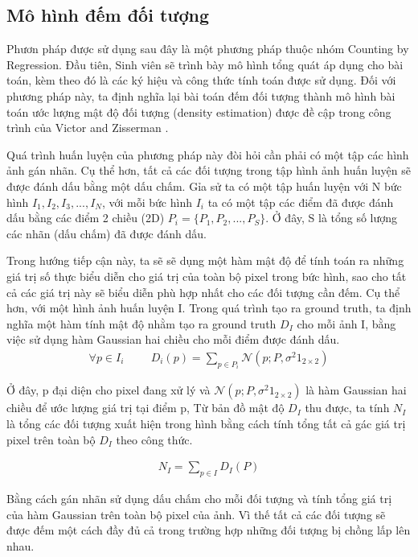 \subsection{Mô hình đếm đối tượng}
	Phươn pháp được sử dụng sau đây là một phương pháp thuộc nhóm Counting by Regression. Đầu tiên, Sinh viên sẽ trình bày mô hình tổng quát áp dụng cho bài toán, kèm theo đó là các ký hiệu và công thức tính toán được sử dụng. Đối với phương pháp này, ta định nghĩa lại bài toán đếm đối tượng thành mô hình bài toán ước lượng mật độ đối tượng (density estimation) được đề cập trong công trình của Victor and Zisserman \cite{lempitsky2010learning}. \par
	Quá trình huấn luyện của phương pháp này đòi hỏi cần phải có một tập các hình ảnh gán nhãn. Cụ thể hơn, tất cả các đối tượng trong tập hình ảnh huấn luyện sẽ được đánh dấu bằng một dấu chấm. Gỉa sử ta có một tập huấn luyện với N bức hình $I_1,I_2,I_3,...,I_N$, với mỗi bức hình $I_i$ ta có một tập các điểm đã được đánh dấu bằng các điểm 2 chiều (2D) $P_i = \{P_1,P_2,...,P_S\}$. Ở đây, S là tổng số lượng các nhãn (dấu chấm) đã được đánh dấu. \par
	Trong hướng tiếp cận này, ta sẽ sẽ dụng một hàm mật độ để tính toán ra những giá trị số thực biểu diễn cho giá trị của toàn bộ pixel trong bức hình, sao cho tất cả các giá trị này sẽ biểu diễn phù hợp nhất cho các đối tượng cần đếm. Cụ thể hơn, với một hình ảnh huấn luyện I. Trong quá trình tạo ra ground truth, ta định nghĩa một hàm tính mật độ nhằm tạo ra ground truth $D_I$ cho mỗi ảnh I, bằng việc sử dụng hàm Gaussian hai chiều cho mỗi điểm được đánh dấu.
\begin{align}
   \forall p \in I_i   \hspace{1cm}   D_i(p) = \displaystyle \sum_{p \in P_i} \mathcal{N}(p;P,\sigma^2 1_{2\times2})
\end{align}

	Ở đây, p đại diện cho pixel đang xử lý và $\mathcal{N}(p;P,\sigma^2 1_{2\times2})$   là hàm Gaussian hai chiều để ước lượng giá trị tại điểm p,  
	Từ bản đồ mật độ $D_I$ thu được, ta tính $N_I$ là tổng các đối tượng xuất hiện trong hình bằng cách tính tổng tất cả gác giá trị pixel trên toàn bộ $D_I$ theo công thức.
	 
\begin{align}
   N_I = \sum_{p \in I}D_I(P)
\end{align}

Bằng cách gán nhãn sử dụng dấu chấm cho mỗi đối tượng và tính tổng giá trị của hàm Gaussian trên toàn bộ pixel của ảnh. Vì thế tất cả các đối tượng sẽ được đếm một cách đầy đủ cả trong trường hợp những đối tượng bị chồng lấp lên nhau.\par

